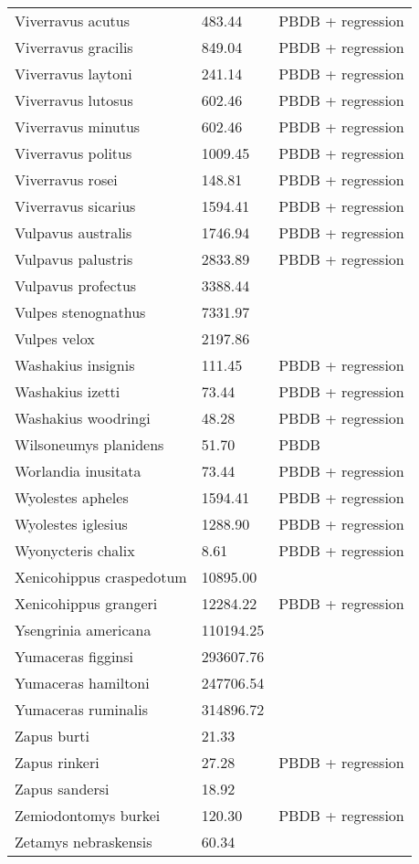 \documentclass{article}
\begin{document}
\begin{center}
\begin{longtable}{p{} p{} p{}}
    Viverravus acutus & 483.44 & PBDB + regression \\ 
    Viverravus gracilis & 849.04 & PBDB + regression \\ 
    Viverravus laytoni & 241.14 & PBDB + regression \\ 
    Viverravus lutosus & 602.46 & PBDB + regression \\ 
    Viverravus minutus & 602.46 & PBDB + regression \\ 
    Viverravus politus & 1009.45 & PBDB + regression \\ 
    Viverravus rosei & 148.81 & PBDB + regression \\ 
    Viverravus sicarius & 1594.41 & PBDB + regression \\ 
    Vulpavus australis & 1746.94 & PBDB + regression \\ 
    Vulpavus palustris & 2833.89 & PBDB + regression \\ 
    Vulpavus profectus & 3388.44 & \cite{Williamson2013} \\ 
    Vulpes stenognathus & 7331.97 & \cite{Tomiya2013} \\ 
    Vulpes velox & 2197.86 & \cite{Smith2004} \\ 
    Washakius insignis & 111.45 & PBDB + regression \\ 
    Washakius izetti & 73.44 & PBDB + regression \\ 
    Washakius woodringi & 48.28 & PBDB + regression \\ 
    Wilsoneumys planidens & 51.70 & PBDB \\ 
    Worlandia inusitata & 73.44 & PBDB + regression \\ 
    Wyolestes apheles & 1594.41 & PBDB + regression \\ 
    Wyolestes iglesius & 1288.90 & PBDB + regression \\ 
    Wyonycteris chalix & 8.61 & PBDB + regression \\ 
    Xenicohippus craspedotum & 10895.00 & \cite{McKenna2011} \\ 
    Xenicohippus grangeri & 12284.22 & PBDB + regression \\ 
    Ysengrinia americana & 110194.25 & \cite{Tomiya2013} \\ 
    Yumaceras figginsi & 293607.76 & \cite{Tomiya2013} \\ 
    Yumaceras hamiltoni & 247706.54 & \cite{Tomiya2013} \\ 
    Yumaceras ruminalis & 314896.72 & \cite{Tomiya2013} \\ 
    Zapus burti & 21.33 & \cite{Tomiya2013} \\ 
    Zapus rinkeri & 27.28 & PBDB + regression \\ 
    Zapus sandersi & 18.92 & \cite{Tomiya2013} \\ 
    Zemiodontomys burkei & 120.30 & PBDB + regression \\ 
    Zetamys nebraskensis & 60.34 & \cite{Tomiya2013} \\ 
  \end{longtable}
\end{center}

\end{document}
